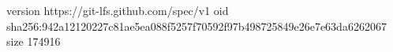 version https://git-lfs.github.com/spec/v1
oid sha256:942a12120227c81ae5ea088f5257f70592f97b498725849e26e7e63da6262067
size 174916
